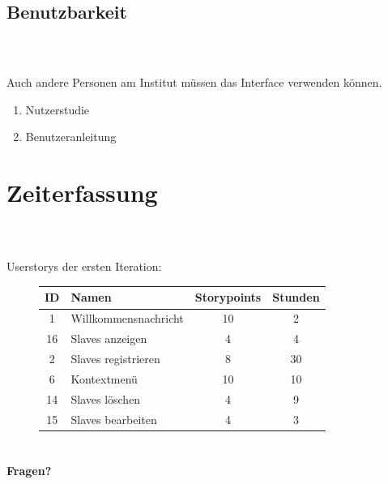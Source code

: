 \documentclass[accentcolor=tud1b,colorbacktitle,landscape,german,presentation]{tudbeamer}
\newcommand{\ftitle}{

	\frametitle{\insertsectionhead \\ {\small \insertsubsectionhead}}
}
\begin{document}
\subsection{Benutzbarkeit}
\begin{frame}
	\ftitle
	Auch andere Personen am Institut müssen das Interface verwenden können.
	\begin{enumerate}
		\item Nutzerstudie
		\item Benutzeranleitung
	\end{enumerate}
\end{frame}

\section{Zeiterfassung}
\begin{frame}
	\ftitle
	Userstorys der ersten Iteration:
	\begin{figure}
		\begin{tabular}{|c|l|c|c|}
			\hline
			ID&Namen&Storypoints&Stunden \\ \hline \hline
			1 &Willkommensnachricht&10&2 \\ \hline
			16&Slaves anzeigen&4&4\\ \hline
			2 &Slaves registrieren&8&30\\ \hline
			6&Kontextmenü&10&10\\ \hline
			14&Slaves löschen&4&9\\ \hline
			15&Slaves bearbeiten&4&3\\ \hline
		\end{tabular}
	\end{figure}

\end{frame}

\section{}
\begin{frame}
	\begin{center}
		\textbf{\LARGE{Fragen?}}
	\end{center}
\end{frame}
\end{document}
